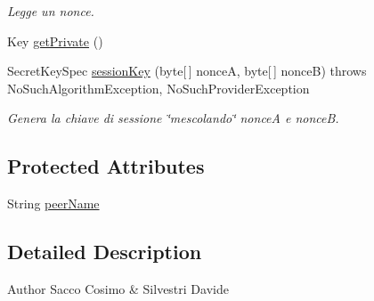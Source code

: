 \begin{DoxyCompactItemize}
\begin{DoxyCompactList}\small\item\em \-Legge un nonce. \end{DoxyCompactList}\item 
\-Key \hyperlink{classit_1_1saccosilvestri_1_1jsp2p_1_1protocol_1_1_protocol_ac851b36e727125969fce606dfc047f23}{get\-Private} ()
\item 
\-Secret\-Key\-Spec \hyperlink{classit_1_1saccosilvestri_1_1jsp2p_1_1protocol_1_1_protocol_a3fe429bdbe79c9b734d578071727cdfb}{session\-Key} (byte\mbox{[}$\,$\mbox{]} nonce\-A, byte\mbox{[}$\,$\mbox{]} nonce\-B)  throws No\-Such\-Algorithm\-Exception, No\-Such\-Provider\-Exception 
\begin{DoxyCompactList}\small\item\em \-Genera la chiave di sessione \char`\"{}mescolando\char`\"{} nonce\-A e nonce\-B. \end{DoxyCompactList}\end{DoxyCompactItemize}
\subsection*{\-Protected \-Attributes}
\begin{DoxyCompactItemize}
\item 
\-String \hyperlink{classit_1_1saccosilvestri_1_1jsp2p_1_1protocol_1_1_protocol_a6dcf1366f63023a80091ab663ecd3060}{peer\-Name}
\end{DoxyCompactItemize}


\subsection{\-Detailed \-Description}
\begin{DoxyAuthor}{\-Author}
\-Sacco \-Cosimo \& \-Silvestri \-Davide 
\end{DoxyAuthor}


